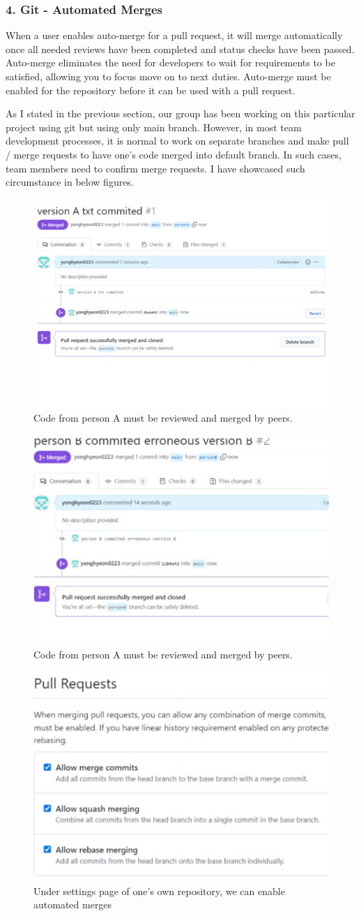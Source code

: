 \documentclass[a4paper, 11pt]{report}
\begin{document}
\subsubsection{4. Git - Automated Merges}
When a user enables auto-merge for a pull request, it will merge automatically once all needed reviews have been completed and status checks have been passed. Auto-merge eliminates the need for developers to wait for requirements to be satisfied, allowing you to focus move on to next duties. Auto-merge must be enabled for the repository before it can be used with a pull request.

As I stated in the previous section, our group has been working on this particular project using git but using only main branch. However, in most team development processes, it is normal to work on separate branches and make pull / merge requests to have one's code merged into default branch. In such cases, team members need to confirm merge requests. I have showcased such circumstance in below figures.

\begin{figure}[h]
\centering
\includegraphics[width=0.45\columnwidth]{Isaac-merge.pdf}
\caption{Code from person A must be reviewed and merged by peers.}
\label{fig}
\end{figure}

\begin{figure}[h]
\centering
\includegraphics[width=0.45\columnwidth]{Isaac-merge2.pdf}
\caption{Code from person A must be reviewed and merged by peers.}
\label{fig}
\end{figure}

\begin{figure}[h]
\centering
\includegraphics[width=0.4\columnwidth]{auto-merge.pdf}
\caption{ Under settings page of one's own repository, we can enable automated merges}
\label{fig}
\end{figure}
\end{document}
